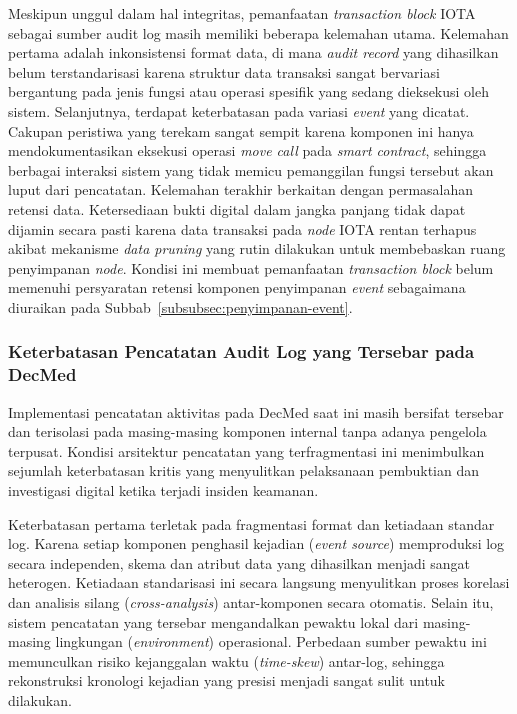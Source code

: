 Meskipun unggul dalam hal integritas, pemanfaatan \textit{transaction block} IOTA sebagai sumber audit log masih memiliki beberapa kelemahan utama. Kelemahan pertama adalah inkonsistensi format data, di mana \textit{audit record} yang dihasilkan belum terstandarisasi karena struktur data transaksi sangat bervariasi bergantung pada jenis fungsi atau operasi spesifik yang sedang dieksekusi oleh sistem. Selanjutnya, terdapat keterbatasan pada variasi \textit{event} yang dicatat. Cakupan peristiwa yang terekam sangat sempit karena komponen ini hanya mendokumentasikan eksekusi operasi \textit{move call} pada \textit{smart contract}, sehingga berbagai interaksi sistem yang tidak memicu pemanggilan fungsi tersebut akan luput dari pencatatan. Kelemahan terakhir berkaitan dengan permasalahan retensi data. Ketersediaan bukti digital dalam jangka panjang tidak dapat dijamin secara pasti karena data transaksi pada \textit{node} IOTA rentan terhapus akibat mekanisme \textit{data pruning} yang rutin dilakukan untuk membebaskan ruang penyimpanan \textit{node}. Kondisi ini membuat pemanfaatan \textit{transaction block} belum memenuhi persyaratan retensi komponen penyimpanan \textit{event} sebagaimana diuraikan pada Subbab~\ref{subsubsec:penyimpanan-event}.

\subsubsection{Keterbatasan Pencatatan Audit Log yang Tersebar pada DecMed}
\label{subsubsec:keterbatasan-tersebar}

Implementasi pencatatan aktivitas pada DecMed saat ini masih bersifat tersebar dan terisolasi pada masing-masing komponen internal tanpa adanya pengelola terpusat. Kondisi arsitektur pencatatan yang terfragmentasi ini menimbulkan sejumlah keterbatasan kritis yang menyulitkan pelaksanaan pembuktian dan investigasi digital ketika terjadi insiden keamanan.

Keterbatasan pertama terletak pada fragmentasi format dan ketiadaan standar log. Karena setiap komponen penghasil kejadian (\textit{event source}) memproduksi log secara independen, skema dan atribut data yang dihasilkan menjadi sangat heterogen. Ketiadaan standarisasi ini secara langsung menyulitkan proses korelasi dan analisis silang (\textit{cross-analysis}) antar-komponen secara otomatis. Selain itu, sistem pencatatan yang tersebar mengandalkan pewaktu lokal dari masing-masing lingkungan (\textit{environment}) operasional. Perbedaan sumber pewaktu ini memunculkan risiko kejanggalan waktu (\textit{time-skew}) antar-log, sehingga rekonstruksi kronologi kejadian yang presisi menjadi sangat sulit untuk dilakukan.

